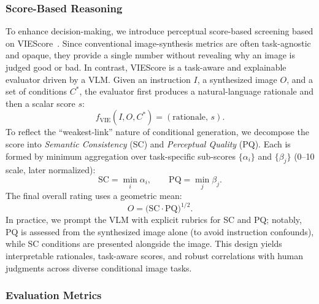 
\subsubsection{Score-Based Reasoning}

To enhance decision-making, we introduce perceptual score-based screening based on VIEScore~\cite{ku2023viescore}. Since conventional image-synthesis metrics are often task-agnostic and opaque, they provide a single number without revealing why an image is judged good or bad. In contrast, VIEScore is a task-aware and explainable evaluator driven by a VLM. Given an instruction $I$, a synthesized image $O$, and a set of conditions $C^*$, the evaluator first produces a natural-language rationale and then a scalar score $s$:
\begin{equation}
f_{\text{VIE}}(I,O,C^{*}) = (\text{rationale},\, s).
\end{equation}
To reflect the ``weakest-link'' nature of conditional generation, we decompose the score into
\emph{Semantic Consistency} (SC) and \emph{Perceptual Quality} (PQ). 
Each is formed by minimum aggregation over task-specific sub-scores $\{\alpha_i\}$ and $\{\beta_j\}$ (0--10 scale, later normalized):
\[
\mathrm{SC}=\min_i \alpha_i,\qquad \mathrm{PQ}=\min_j \beta_j.
\]
The final overall rating uses a geometric mean:
\begin{equation}
O=\big(\mathrm{SC}\cdot \mathrm{PQ}\big)^{1/2}.
\end{equation}
In practice, we prompt the VLM with explicit rubrics for SC and PQ; notably, PQ is assessed from the synthesized image alone (to avoid instruction confounds), while SC conditions are presented alongside the image. 
This design yields interpretable rationales, task-aware scores, and robust correlations with human judgments across diverse conditional image tasks.



\subsubsection{Evaluation Metrics}

